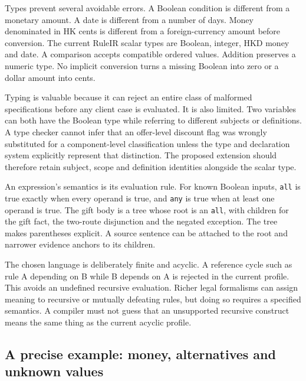 Types prevent several avoidable errors. A Boolean condition is different from
a monetary amount. A date is different from a number of days. Money denominated
in HK cents is different from a foreign-currency amount before conversion.
The current RuleIR scalar types are Boolean, integer, HKD money and date. A
comparison accepts compatible ordered values. Addition preserves a numeric
type. No implicit conversion turns a missing Boolean into zero or a dollar
amount into cents.


Typing is valuable because it can reject an entire class of malformed
specifications before any client case is evaluated. It is also limited. Two
variables can both have the Boolean type while referring to different subjects
or definitions. A type checker cannot infer that an offer-level discount flag
was wrongly substituted for a component-level classification unless the type
and declaration system explicitly represent that distinction. The proposed
extension should therefore retain subject, scope and definition identities
alongside the scalar type.

An expression's semantics is its evaluation rule. For known Boolean inputs,
\texttt{all} is true exactly when every operand is true, and \texttt{any} is true
when at least one operand is true. The gift body is a tree whose root is an
\texttt{all}, with children for the gift fact, the two-route disjunction and
the negated exception. The tree makes parentheses explicit. A source sentence
can be attached to the root and narrower evidence anchors to its children.

The chosen language is deliberately finite and acyclic. A reference cycle such
as rule A depending on B while B depends on A is rejected in the current
profile. This avoids an undefined recursive evaluation. Richer legal formalisms
can assign meaning to recursive or mutually defeating rules, but doing so
requires a specified semantics. A compiler must not guess that an unsupported
recursive construct means the same thing as the current acyclic profile.

\subsection{A precise example: money, alternatives and unknown values}
\label{merge:P-03-product:03}

